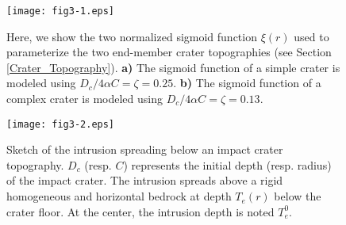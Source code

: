 \begin{article}
\begin{figure}[pb]
\graphicspath{{/Users/thorey/Documents/These/Submission/Article/FFC_JGR_2013/Paper_APRES_2nd_REVIEW/}}
  \centering
  \noindent\texttt{[image: fig3-1.eps]}
  \caption{ Here, we show the two normalized sigmoid function $\xi(r)$
    used to  parameterize the two end-member  crater topographies (see
    Section \ref{Crater_Topography}). \textbf{a)} The sigmoid function
    of    a   simple    crater   is    modeled   using    $D_c/4\alpha
    C=\zeta=0.25$.
    \textbf{b)} The  sigmoid function of  a complex crater  is modeled
    using $D_c/4\alpha C=\zeta=0.13$. }
  \label{fig3-1}
\end{figure}

\begin{figure}[pb]
\graphicspath{{/Users/thorey/Documents/These/Submission/Article/FFC_JGR_2013/Paper_APRES_2nd_REVIEW/}}
  \begin{center}
    \texttt{[image: fig3-2.eps]}
    \caption{Sketch of the intrusion  spreading below an impact crater
      topography.  $D_{c}$ (resp.  $C$) represents  the initial  depth
      (resp. radius) of the impact crater. The intrusion spreads above
      a rigid  homogeneous and horizontal bedrock  at depth $T_{e}(r)$
      below the  crater floor. At  the center, the intrusion  depth is
      noted $T_{e}^0$.}
    \label{fig3-2}
  \end{center}
\end{figure}



\end{article}
